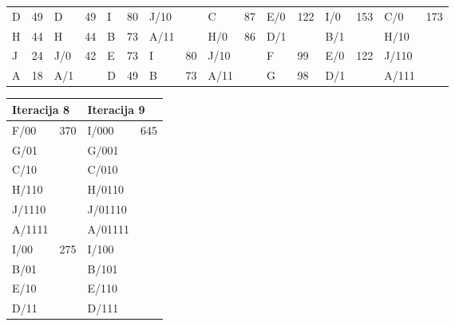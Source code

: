 \documentclass[12pt]{article}
\begin{document}
\begin{table}[hp]
\begin{tabular}{|l|l|l|l|l|l|l|l|l|l|l|l|l|l|l|l|}
D             & 49            & D   & 49                                       & I       & 80                     & J/10    &                        & C       & 87                     & E/0     & \multirow{2}{*}{122}   & I/0     & \multirow{2}{*}{153}   & C/0     & \multirow{4}{*}{173}   \\ \cline{1-6} \cline{9-10}
H             & 44            & H   & 44                                       & B       & 73                     & A/11    &                        & H/0     & \multirow{3}{*}{86}    & D/1     &                        & B/1     &                        & H/10    &                        \\ \cline{1-8} \cline{11-14}
J             & 24            & J/0 & \multicolumn{1}{c|}{\multirow{2}{*}{42}} & E       & 73                     & I       & 80                     & J/10    &                        & F       & 99                     & E/0     & \multirow{2}{*}{122}   & J/110   &                        \\ \cline{1-2} \cline{5-8} \cline{11-12}
A             & 18            & A/1 & \multicolumn{1}{c|}{}                    & D       & 49                     & B       & 73                     & A/11    &                        & G       & 98                     & D/1     &                        & A/111   &                        \\ \hline
\end{tabular}
\end{table}

\begin{table}[hp]
\centering
\begin{tabular}{|l|l|l|l|}
\hline
\multicolumn{2}{|l|}{Iteracija 8} & \multicolumn{2}{l|}{Iteracija 9} \\ \hline
F/00 & \multirow{6}{*}{370} & I/000 & \multirow{10}{*}{645} \\
G/01 &  & G/001 &  \\
C/10 &  & C/010 &  \\
H/110 &  & H/0110 &  \\
J/1110 &  & J/01110 &  \\
A/1111 &  & A/01111 &  \\ \cline{1-2}
I/00 & \multirow{4}{*}{275} & I/100 &  \\
B/01 &  & B/101 &  \\
E/10 &  & E/110 &  \\
D/11 &  & D/111 &  \\ \hline
\end{tabular}
\end{table}
\end{document}
